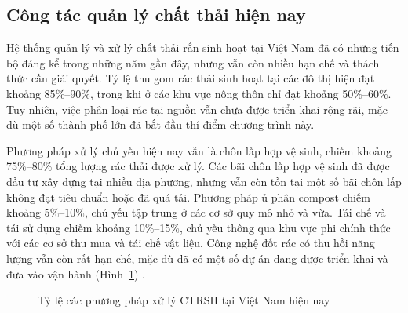 \documentclass[../main.tex]{subfiles}
\begin{document}
\subsection{Công tác quản lý chất thải hiện nay}

Hệ thống quản lý và xử lý chất thải rắn sinh hoạt tại Việt Nam đã có những tiến bộ đáng kể trong những năm gần đây, nhưng vẫn còn nhiều hạn chế và thách thức cần giải quyết. Tỷ lệ thu gom rác thải sinh hoạt tại các đô thị hiện đạt khoảng 85$\%$--90$\%$, trong khi ở các khu vực nông thôn chỉ đạt khoảng 50$\%$--60$\%$. Tuy nhiên, việc phân loại rác tại nguồn vẫn chưa được triển khai rộng rãi, mặc dù một số thành phố lớn đã bắt đầu thí điểm chương trình này.

Phương pháp xử lý chủ yếu hiện nay vẫn là chôn lấp hợp vệ sinh, chiếm khoảng 75$\%$--80$\%$ tổng lượng rác thải được xử lý. Các bãi chôn lấp hợp vệ sinh đã được đầu tư xây dựng tại nhiều địa phương, nhưng vẫn còn tồn tại một số bãi chôn lấp không đạt tiêu chuẩn hoặc đã quá tải. Phương pháp ủ phân compost chiếm khoảng 5$\%$--10$\%$, chủ yếu tập trung ở các cơ sở quy mô nhỏ và vừa. Tái chế và tái sử dụng chiếm khoảng 10$\%$--15$\%$, chủ yếu thông qua khu vực phi chính thức với các cơ sở thu mua và tái chế vật liệu. Công nghệ đốt rác có thu hồi năng lượng vẫn còn rất hạn chế, mặc dù đã có một số dự án đang được triển khai và đưa vào vận hành (Hình~\ref{fig:ty-le-xu-ly-rac-viet-nam}) \cite{MONRE2020}.

\begin{figure}[H]
\centering
\makeatletter
\def\pgfpie@legend#1{%
  \coordinate[xshift=0.8cm,
  yshift={(\the\pgfpie@sliceLength*0.5+1)*0.8cm}] (pgfpie@legendpos) at
  (current bounding box.east);

  \scope[node distance=0.8cm]
    \foreach \pgfpie@p/\pgfpie@t [count=\pgfpie@i from 0] in {#1}
    {
      \pgfpie@findColor{\pgfpie@i}
      \node[draw, fill={\pgfpie@thecolor}, \pgfpie@style, below of={pgfpie@legendpos}, label={0:{\pgfpie@t}}] (pgfpie@legendpos) {};
    }
  \endscope
}
\makeatother
{}
\caption{Tỷ lệ các phương pháp xử lý CTRSH tại Việt Nam hiện nay}
\label{fig:ty-le-xu-ly-rac-viet-nam}
\end{figure}
\end{document}
